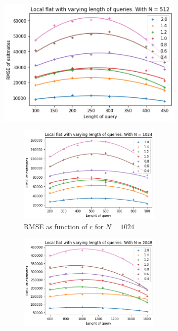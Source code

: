 \documentclass[11pt]{article}
\theoremstyle{definition}
\begin{document}
\begin{figure}[H]
\begin{subfigure}{.4\textwidth}
  \includegraphics[width=\linewidth]{figures/local_flat/varying_r/loc_flat_varying_length_N_poly_=512.png}
  \caption{RMSE as function of $r$ for $N=512$}
  \label{fig:31}
  \begin{subfigure}{\textwidth}
  \centering
  \includegraphics[width=\linewidth]{figures/local_flat/varying_r/loc_flat_varying_length_N_poly_=1024.png}
  \caption{RMSE as function of $r$ for $N=1024$}
  \label{fig:32}
\end{subfigure}
\begin{subfigure}{\textwidth}
  \centering
  \includegraphics[width=\linewidth]{figures/local_flat/varying_r/loc_flat_varying_length_N_poly_=2048.png}

\end{subfigure}
\end{subfigure}
\end{figure}
\end{document}
